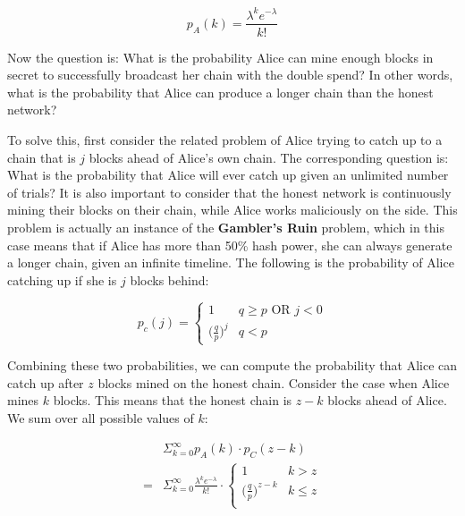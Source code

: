 \documentclass[11pt]{article}
\begin{document}
   $$p_A(k) = \frac{\lambda^k e^{-\lambda}}{k!}$$
   
   Now the question is: What is the probability Alice can mine enough blocks in secret to successfully broadcast her chain with the double spend? In other words, what is the probability that Alice can produce a longer chain than the honest network? 
   
   To solve this, first consider the related problem of Alice trying to catch up to a chain that is $j$ blocks ahead of Alice's own chain. The corresponding question is: What is the probability that Alice will ever catch up given an unlimited number of trials? It is also important to consider that the honest network is continuously mining their blocks on their chain, while Alice works maliciously on the side. This problem is actually an instance of the \textbf{Gambler's Ruin} problem, which in this case means that if Alice has more than 50\% hash power, she can always generate a longer chain, given an infinite timeline. The following is the probability of Alice catching up if she is $j$ blocks behind: 
   
   \[ p_c(j) = \begin{cases} 
      1 & q \geq p \text{ OR } j < 0 \\
      \big(\frac{q}{p}\big)^j & q < p
   \end{cases}
   \]
   
   Combining these two probabilities, we can compute the probability that Alice can catch up after $z$ blocks mined on the honest chain. Consider the case when Alice mines $k$ blocks. This means that the honest chain is $z-k$ blocks ahead of Alice. We sum over all possible values of $k$:
   
   \begin{equation*}
       \begin{split}
           &\Sigma_{k=0}^\infty p_A(k) \cdot p_C(z-k) \\
           = &\Sigma_{k=0}^\infty \frac{\lambda^k e^{-\lambda}}{k!} \cdot  \left\{
    \begin{array}{ll}
      1  & k > z \\ 
      \big(\frac{q}{p}\big)^{z-k} & k \leq z \\
    \end{array}
  \right.
       \end{split}
   \end{equation*}
   
\end{document}

